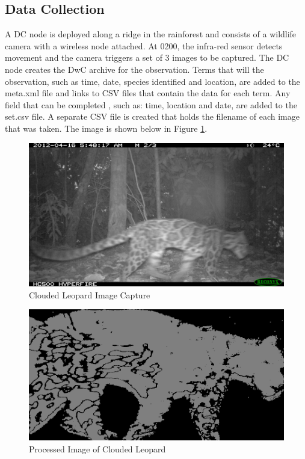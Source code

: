 		\subsection{Data Collection}
			A DC node is deployed along a ridge in the rainforest and consists of a wildlife camera with a wireless node attached. At 0200, the infra-red sensor detects movement and the camera triggers a set of 3 images to be captured. The DC node creates the DwC archive for the observation. Terms that will the observation, such as time, date, species identified and location, are added to the meta.xml file and links to CSV files that contain the data for each term. Any field that can be completed , such as: time, location and date, are added to the set.csv file. A separate CSV file is created that holds the filename of each image that was taken. The image is shown below in Figure \ref{cl2}.
			
			\begin{figure}[!t]
			\centering
			\includegraphics[width=\textwidth]{Chap4/figures/leopard2.JPG}
			\caption{Clouded Leopard Image Capture}
			\label{cl2}
			\end{figure}

			\begin{figure}[!t]
			\centering
			\includegraphics[width=\textwidth]{Chap4/figures/leopard_proc}
			\caption{Processed Image of Clouded Leopard}
			\label{clproc}
			\end{figure}
			
